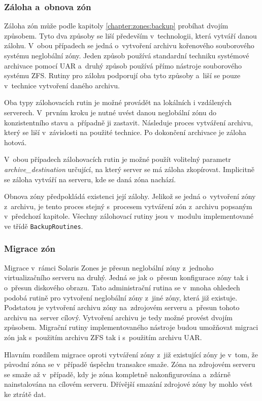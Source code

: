 \subsubsection{Záloha a~obnova zón}
\label{chapter:implementation:szones:routines:backup}
Záloha zón může podle kapitoly \ref{chapter:zones:backup} probíhat dvojím způsobem. Tyto dva způsoby se liší především v~technologii,
která vytváří danou zálohu. V~obou případech se jedná o~vytvoření archivu kořenového souborového systému neglobální zóny. Jeden
způsob používá standardní techniku systémové archivace pomocí UAR a~druhý způsob používá přímo nástroje souborového
systému ZFS. Rutiny pro zálohu podporují oba tyto způsoby a~liší se pouze v~technice vytvoření daného archivu.

Oba typy zálohovacích rutin je možné provádět na lokálních i vzdálených serverech. V~prvním kroku je nutné uvést danou neglobální
zónu do konzistentního stavu a~případně ji zastavit. Následuje proces vytváření archivu, který se liší v~závislosti na
použité technice. Po dokončení archivace je záloha hotová. 

V~obou případech zálohovacích rutin je možné použít volitelný parametr \textit{archive\_destination} určující, na který server 
se má záloha zkopírovat. Implicitně se záloha vytváří na serveru, kde se daná zóna nachází.

Obnova zóny předpokládá existenci její zálohy. Jelikož se jedná o~vytvoření zóny z~archivu, je tento proces stejný
s~procesem vytváření zón z~archivu popsaným v~předchozí kapitole. Všechny zálohovací rutiny jsou v~modulu implementované ve třídě
\verb|BackupRoutines|.
\subsubsection{Migrace zón}
\label{chapter:implementation:szones:routines:migration}
Migrace v~rámci Solaris Zones je přesun neglobální zóny z~jednoho virtualizačního serveru na druhý. Jedná se jak o~přesun
konfigurace zóny tak i o~přesun diskového obrazu. Tato administrační rutina se v~mnoha ohledech podobá rutině pro vytvoření
neglobální zóny z~jiné zóny, která již existuje. Podstatou je vytvoření archivu zóny na~zdrojovém serveru a~přesun tohoto archivu
na~server cílový. Vytvoření archivu je tedy možné provést dvojím způsobem. Migrační rutiny
implementovaného nástroje budou umožňovat migraci zón jak s~použitím archivu ZFS tak i s~použitím archivu UAR.

Hlavním rozdílem migrace oproti vytváření zóny z~již existující zóny je v~tom, že původní zóna se v~případě úspěchu transakce smaže.
Zóna na zdrojovém serveru se smaže až v~případě, kdy je zóna kompletně nakonfigurována a~zdárně nainstalována na
cílovém serveru. Dřívější smazání zdrojové zóny by mohlo vést ke ztrátě dat.

